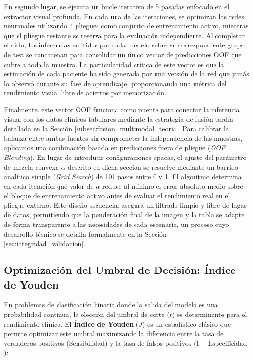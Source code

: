 \documentclass[12pt, oneside, english, spanish]{book}
\begin{document}
En segundo lugar, se ejecuta un bucle iterativo de 5 pasadas enfocado en el extractor visual profundo. En cada una de las iteraciones, se optimizan las redes neuronales utilizando 4 pliegues como conjunto de entrenamiento activo, mientras que el pliegue restante se reserva para la evaluación independiente. Al completar el ciclo, las inferencias emitidas por cada modelo sobre su correspondiente grupo de test se concatenan para consolidar un único vector de predicciones OOF que cubre a toda la muestra. La particularidad crítica de este vector es que la estimación de cada paciente ha sido generada por una versión de la red que jamás lo observó durante su fase de aprendizaje, proporcionando una métrica del rendimiento visual libre de aciertos por memorización.

Finalmente, este vector OOF funciona como puente para conectar la inferencia visual con los datos clínicos tabulares mediante la estrategia de fusión tardía detallada en la Sección \ref{subsec:fusion_multimodal_teoria}. Para calibrar la balanza entre ambas fuentes sin comprometer la independencia de las muestras, aplicamos una combinación basada en predicciones fuera de pliegue (\textit{OOF Blending}). En lugar de introducir configuraciones opacas, el ajuste del parámetro de mezcla convexa $\alpha$ descrito en dicha sección se resuelve mediante un barrido analítico simple (\textit{Grid Search}) de 101 pasos entre 0 y 1. El algoritmo determina en cada iteración qué valor de $\alpha$ reduce al mínimo el error absoluto medio sobre el bloque de entrenamiento activo antes de evaluar el rendimiento real en el pliegue externo. Este diseño secuencial asegura un filtrado limpio y libre de fugas de datos, permitiendo que la ponderación final de la imagen y la tabla se adapte de forma transparente a las necesidades de cada escenario, un proceso cuyo desarrollo técnico se detalla formalmente en la Sección \ref{sec:integridad_validacion}.

\subsection{Optimización del Umbral de Decisión: Índice de Youden} \label{subsec:teoria_youden}

En problemas de clasificación binaria donde la salida del modelo es una probabilidad continua, la elección del umbral de corte ($t$) es determinante para el rendimiento clínico. El \textbf{Índice de Youden} ($J$) es un estadístico clásico que permite optimizar este umbral maximizando la diferencia entre la tasa de verdaderos positivos (Sensibilidad) y la tasa de falsos positivos ($1 - \text{Especificidad}$):
\end{document}
